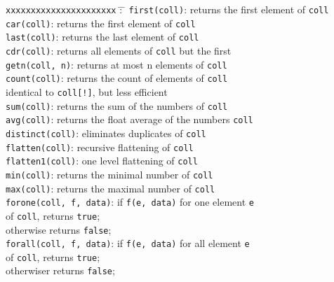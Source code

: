 \begin{tabbing}
\texttt{xxxxxxxxxxxxxxxxxxxxxx} \= : \=\kill
\texttt{first(coll)}\>: returns the first element of \texttt{coll}\\
\texttt{car(coll)}\>: returns the first element of \texttt{coll}\\
\texttt{last(coll)}\>: returns the last element of \texttt{coll}\\
\texttt{cdr(coll)}\>: returns all elements of \texttt{coll} but the first\\
\texttt{getn(coll, n)}\>: returns at most n elements of \texttt{coll}\\
\texttt{count(coll)}\>: returns the count of elements of \texttt{coll}\\
\>\> identical to \texttt{coll[!]}, but less efficient\\
\texttt{sum(coll)}\>: returns the sum of the numbers of \texttt{coll}\\
\texttt{avg(coll)}\>: returns the float average of the numbers \texttt{coll}\\
\texttt{distinct(coll)}\>: eliminates duplicates of \texttt{coll}\\
\texttt{flatten(coll)}\>: recursive flattening of \texttt{coll}\\
\texttt{flatten1(coll)}\>: one level flattening of \texttt{coll}\\
\texttt{min(coll)}\>: returns the minimal number of \texttt{coll}\\
\texttt{max(coll)}\>: returns the maximal number of \texttt{coll}\\
\texttt{forone(coll, f, data)}\>: if \texttt{f(e, data)} for one element
\texttt{e}\\
\>\> of \texttt{coll}, returns \texttt{true};\\
\>\> otherwise returns \texttt{false};\\
\texttt{forall(coll, f, data)}\>: if \texttt{f(e, data)} for all element
\texttt{e}\\
\>\> of \texttt{coll}, returns \texttt{true};\\
\>\> otherwiser returns \texttt{false};\\
\end{tabbing}

